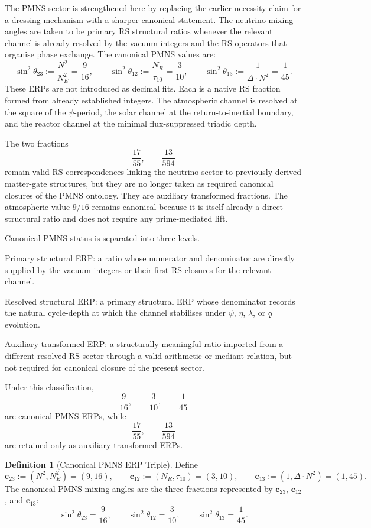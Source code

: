 \documentclass[11pt, letterpaper]{article}
\newcommand{\koppa}{\mathbin{\text{\rm\k{o}}}}
\theoremstyle{definition}
\newtheorem{definition}{Definition}[section]
\theoremstyle{plain}
\begin{document}
The PMNS sector is strengthened here by replacing the earlier necessity claim
for a dressing mechanism with a sharper canonical statement. The neutrino
mixing angles are taken to be primary RS structural ratios whenever the
relevant channel is already resolved by the vacuum integers and the RS
operators that organise phase exchange. The canonical PMNS values are:
\[
\sin^2\theta_{23} := \frac{N^2}{N_E^2} = \frac{9}{16}, \qquad
\sin^2\theta_{12} := \frac{N_R}{\tau_{10}} = \frac{3}{10}, \qquad
\sin^2\theta_{13} := \frac{1}{\Delta \cdot N^2} = \frac{1}{45}.
\]
These ERPs are not introduced as decimal fits. Each is a native RS fraction
formed from already established integers. The atmospheric channel is resolved
at the square of the $\psi$-period, the solar channel at the return-to-inertial
boundary, and the reactor channel at the minimal flux-suppressed triadic depth.

The two fractions
\[
\frac{17}{55}, \qquad \frac{13}{594}
\]
remain valid RS correspondences linking the neutrino sector to previously
derived matter-gate structures, but they are no longer taken as required
canonical closures of the PMNS ontology. They are auxiliary transformed
fractions. The atmospheric value $9/16$ remains canonical because it is itself
already a direct structural ratio and does not require any prime-mediated lift.

\begin{observebox}
Canonical PMNS status is separated into three levels.

\medskip
Primary structural ERP: a ratio whose numerator and denominator are directly
supplied by the vacuum integers or their first RS closures for the relevant
channel.

\medskip
Resolved structural ERP: a primary structural ERP whose denominator records
the natural cycle-depth at which the channel stabilises under $\psi$,
$\eta$, $\lambda$, or $\koppa$ evolution.

\medskip
Auxiliary transformed ERP: a structurally meaningful ratio imported from a
different resolved RS sector through a valid arithmetic or mediant relation,
but not required for canonical closure of the present sector.

\medskip
Under this classification,
\[
\frac{9}{16}, \qquad \frac{3}{10}, \qquad \frac{1}{45}
\]
are canonical PMNS ERPs, while
\[
\frac{17}{55}, \qquad \frac{13}{594}
\]
are retained only as auxiliary transformed ERPs.
\end{observebox}

\begin{definition}[Canonical PMNS ERP Triple]
Define
\[
\mathbf{c}_{23} := (N^2, N_E^2) = (9,16), \qquad
\mathbf{c}_{12} := (N_R, \tau_{10}) = (3,10), \qquad
\mathbf{c}_{13} := (1, \Delta \cdot N^2) = (1,45).
\]
The canonical PMNS mixing angles are the three fractions represented by
$\mathbf{c}_{23}$, $\mathbf{c}_{12}$, and $\mathbf{c}_{13}$:
\[
\sin^2\theta_{23} = \frac{9}{16}, \qquad
\sin^2\theta_{12} = \frac{3}{10}, \qquad
\sin^2\theta_{13} = \frac{1}{45}.
\]
\end{definition}
\end{document}
